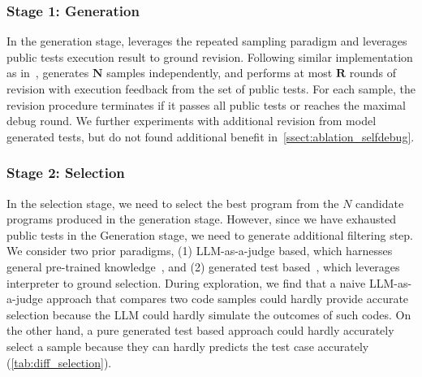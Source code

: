 \subsubsection{Stage 1: Generation}
\label{sec:scale_parallel_samples}
In the generation stage, \frameworkname leverages the repeated sampling paradigm and leverages public tests execution result to ground revision. %
Following similar implementation as in~\citet{chen2023teaching}, \frameworkname  generates $\mathbf{N}$ samples independently, and performs at most $\mathbf{R}$ rounds of revision with execution feedback from the set of public tests. For each sample, the revision procedure terminates if it passes all public tests or reaches the maximal debug round. We further experiments with additional revision from model generated tests, but do not found additional benefit in~\autoref{ssect:ablation_selfdebug}.


\subsubsection{Stage 2: Selection}
\label{sec:scale_selection}
In the selection stage, we need to select the best program from the $N$ candidate programs produced in the generation stage. However, since we have exhausted public tests in the Generation stage, we need to generate additional filtering step. We consider two prior paradigms, (1) LLM-as-a-judge based, which harnesses general pre-trained knowledge~\citep{zheng2023judging}, and (2) generated test based~\citep{li2022competition}, which leverages interpreter to ground selection. During exploration, we find that a naive LLM-as-a-judge approach that compares two code samples could hardly provide accurate selection because the LLM could hardly simulate the outcomes of such codes. On the other hand, a pure generated test based approach could hardly accurately select a sample because they can hardly predicts the test case accurately (\autoref{tab:diff_selection}).

